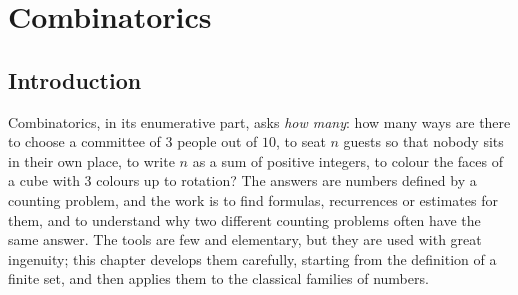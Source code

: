 \chapter{Combinatorics}\label{combinatorics}

\section{Introduction}\label{combinatorics:section-introduction}

Combinatorics, in its enumerative part, asks \emph{how many}: how many ways are there to choose a committee of $3$ people out of $10$, to seat $n$ guests so that nobody sits in their own place, to
write $n$ as a sum of positive integers, to colour the faces of a cube with $3$ colours up to rotation? The answers are numbers defined by a counting problem, and the work is to find formulas,
recurrences or estimates for them, and to understand why two different counting problems often have the same answer. The tools are few and elementary, but they are used with great ingenuity; this
chapter develops them carefully, starting from the definition of a finite set, and then applies them to the classical families of numbers.
